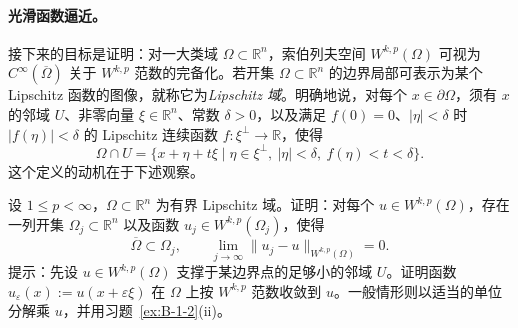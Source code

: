 \paragraph{光滑函数逼近。} 接下来的目标是证明：对一大类域 $\Omega\subset\mathbb R^n$，索伯列夫空间 $W^{k,p}(\Omega)$ 可视为 $C^\infty(\overline\Omega)$ 关于 $W^{k,p}$ 范数的完备化。若开集 $\Omega\subset\mathbb R^n$ 的边界局部可表示为某个 Lipschitz 函数的图像，就称它为\emph{Lipschitz 域}。明确地说，对每个 $x\in\partial\Omega$，须有 $x$ 的邻域 $U$、非零向量 $\xi\in\mathbb R^n$、常数 $\delta>0$，以及满足 $f(0)=0$、$|\eta|<\delta$ 时 $|f(\eta)|<\delta$ 的 Lipschitz 连续函数 $f:\xi^\perp\to\mathbb R$，使得
\[
  \Omega\cap U=\{x+\eta+t\xi\mid\eta\in\xi^\perp,\ |\eta|<\delta,\ f(\eta)<t<\delta\}.
\]
这个定义的动机在于下述观察。

\begin{exercise}\label{ex:B-1-3}
设 $1\le p<\infty$，$\Omega\subset\mathbb R^n$ 为有界 Lipschitz 域。证明：对每个 $u\in W^{k,p}(\Omega)$，存在一列开集 $\Omega_j\subset\mathbb R^n$ 以及函数 $u_j\in W^{k,p}(\Omega_j)$，使得
\[
  \overline\Omega\subset\Omega_j,\qquad
  \lim_{j\to\infty}\|u_j-u\|_{W^{k,p}(\Omega)}=0.
\]
提示：先设 $u\in W^{k,p}(\Omega)$ 支撑于某边界点的足够小的邻域 $U$。证明函数 $u_\varepsilon(x):=u(x+\varepsilon\xi)$ 在 $\Omega$ 上按 $W^{k,p}$ 范数收敛到 $u$。一般情形则以适当的单位分解乘 $u$，并用习题~\ref{ex:B-1-2}(ii)。
\end{exercise}


